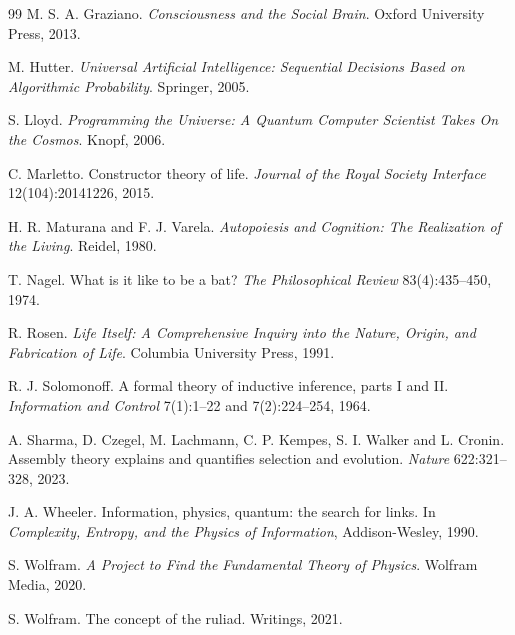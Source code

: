 \begin{thebibliography}{99}
 M. S. A. Graziano. \emph{Consciousness and the Social Brain}.
Oxford University Press, 2013.

 M. Hutter. \emph{Universal Artificial Intelligence: Sequential
Decisions Based on Algorithmic Probability}. Springer, 2005.

 S. Lloyd. \emph{Programming the Universe: A Quantum Computer
Scientist Takes On the Cosmos}. Knopf, 2006.

 C. Marletto. Constructor theory of life. \emph{Journal of the
Royal Society Interface} 12(104):20141226, 2015.

 H. R. Maturana and F. J. Varela. \emph{Autopoiesis and
Cognition: The Realization of the Living}. Reidel, 1980.

 T. Nagel. What is it like to be a bat? \emph{The Philosophical
Review} 83(4):435--450, 1974.

 R. Rosen. \emph{Life Itself: A Comprehensive Inquiry into the
Nature, Origin, and Fabrication of Life}. Columbia University Press, 1991.

 R. J. Solomonoff. A formal theory of inductive inference,
parts I and II. \emph{Information and Control} 7(1):1--22 and 7(2):224--254, 1964.

 A. Sharma, D. Czegel, M. Lachmann, C. P. Kempes, S. I. Walker and
L. Cronin. Assembly theory explains and quantifies selection and evolution.
\emph{Nature} 622:321--328, 2023.

 J. A. Wheeler. Information, physics, quantum: the search for
links. In \emph{Complexity, Entropy, and the Physics of Information}, Addison-Wesley,
1990.

 S. Wolfram. \emph{A Project to Find the Fundamental Theory of
Physics}. Wolfram Media, 2020.

 S. Wolfram. The concept of the ruliad. Writings, 2021.

\end{thebibliography}

